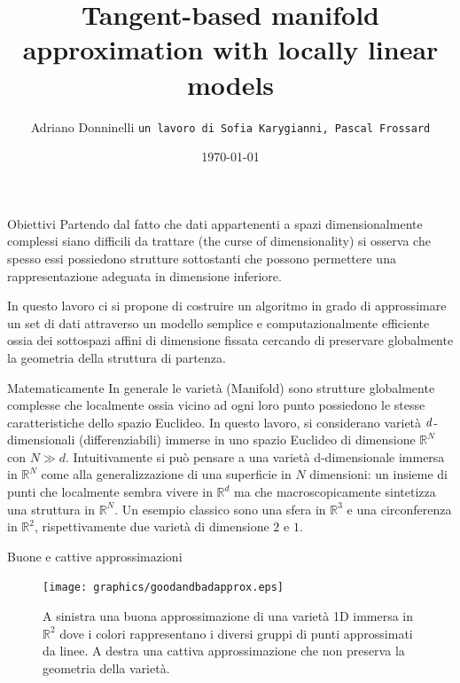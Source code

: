 \documentclass[usenames,dvipsnames,9pt]{beamer}
\title[Università di Bologna]{\Huge{Tangent-based manifold approximation with locally linear models}}
\date[\today]{\small\today}
\author[Adriano Donninelli]{
  Adriano Donninelli
  \pdfnewline
  \texttt{un lavoro di Sofia Karygianni, Pascal Frossard}
}
\institute{Università di Bologna}
\newcommand{\RR}{\mathbb{R}}
\theoremstyle{definition}
\begin{document}
\large

\begin{frame}
\titlepage
\end{frame}

\begin{frame}{Obiettivi}
Partendo dal fatto che dati appartenenti a spazi dimensionalmente complessi siano difficili da trattare (the curse of dimensionality)
si osserva che spesso essi possiedono strutture sottostanti che possono permettere una rappresentazione adeguata in dimensione inferiore.
\vskip 0.2in

In questo lavoro ci si propone di costruire un algoritmo in grado di approssimare un set di dati attraverso un modello semplice e computazionalmente efficiente ossia dei sottospazi affini di dimensione fissata cercando di preservare globalmente la geometria della struttura di partenza.
\end{frame}

\begin{frame}{Matematicamente}
In generale le varietà (Manifold) sono strutture globalmente complesse che localmente ossia vicino ad ogni loro punto possiedono le stesse caratteristiche dello spazio Euclideo. In questo lavoro, si considerano varietà $\it d$-dimensionali (differenziabili) immerse in uno spazio Euclideo di dimensione $\RR^{N}$ con $N \gg d$.
	Intuitivamente si può pensare a una varietà d-dimensionale immersa in $\RR^{N}$ come alla generalizzazione di una superficie in $N$ dimensioni: un insieme di punti che localmente sembra vivere in $\RR^{d}$ ma che macroscopicamente sintetizza una struttura in $\RR^{N}$.
\vskip 0.2in
Un esempio classico sono una sfera in $\RR^{3}$ e una circonferenza in $\RR^{2}$, rispettivamente due varietà di dimensione $2$ e $1$.
\end{frame}

\begin{frame}{Buone e cattive approssimazioni}
\begin{figure}[b]
\centering
\texttt{[image: graphics/goodandbadapprox.eps]}
\caption{A sinistra una buona approssimazione di una varietà 1D immersa in $\RR^{2}$ dove i colori rappresentano i diversi gruppi di punti approssimati da linee. A destra una cattiva approssimazione che non preserva la geometria della varietà.}
\end{figure}
\end{frame}
\end{document}
